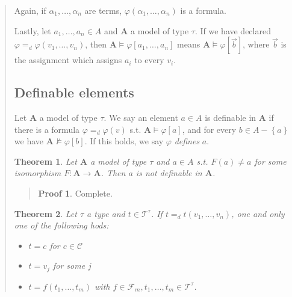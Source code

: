 \documentclass[a4paper, 12pt]{article}
\newtheorem{theorem}{Theorem}
\theoremstyle{definition}
\theoremstyle{definition}
\theoremstyle{definition}
\newtheorem{pro}{Proof}
\begin{document}
\begin{quote}
Again, if $\alpha_1, \ldots, \alpha_n$ are terms, $\varphi(\alpha_1, \ldots,
\alpha_n)$ is a formula.

Lastly, let $a_1, \ldots, a_n \in A$ and $\textbf{A}$ a model of type $\tau$.
If we have declared $\varphi =_d \varphi(v_1, \ldots, v_n)$, then $\textbf{A}
\vDash \varphi[a_1, \ldots, a_n]$ means $\textbf{A} \vDash
\varphi[\overrightarrow{b}]$, where $\overrightarrow{b}$ is the assignment
which assigns $a_i$ to every $v_i$.

\subsection{Definable elements}

Let $\textbf{A}$ a model of type $\tau$. We say an element $a \in A$ is
definable in $\textbf{A}$ if there is a formula $\varphi =_d \varphi(v)$ s.t.
$\textbf{A} \vDash \varphi[a]$, and for every $b \in A - \left\{ a \right\} $
we have $\textbf{A} \not\vDash \varphi[b]$. If this holds, we 
say $\varphi$ \textit{defines} $a$.

\begin{theorem}
    Let $\textbf{A}$ a model of type $\tau$ and $a \in A$ s.t. $F(a) \neq a$ for some 
    isomorphism $F : \textbf{A} \to  \textbf{A}$. Then $a$ is not 
    definable in $\textbf{A}$.
\end{theorem}


\small
\begin{quote}

\begin{pro}
    Complete.
\end{pro}

\end{quote}
\normalsize

\begin{theorem}
    Let $\tau$ a type and $t \in \mathcal{T}^\tau$. If $t =_d t(v_1, \ldots, v_n)$,
    one and only one of the following hods: 

    \begin{itemize}
        \item $t = c$ for $c \in \mathcal{C}$
        \item $t = v_j$ for some $j$
        \item $t = f(t_1, \ldots, t_m)$ with $f \in \mathcal{F}_m, t_1, \ldots, t_m \in \mathcal{T}^\tau$.
    \end{itemize}
\end{theorem}


\end{quote}
\end{document}
